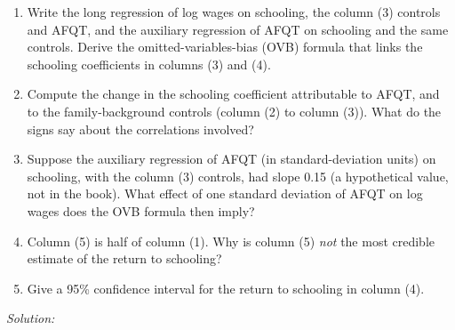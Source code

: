 \documentclass[11pt,a4paper]{article}
\newif\ifsolucoes
\newcommand{\espacoresol}{4.5cm}   %
\newcommand{\resolespaco}{\ifsolucoes\else\par\textit{Solution:}\vspace{\espacoresol}\par\fi}
\begin{document}
\begin{enumerate}[label=(\alph*)]
\item Write the long regression of log wages on schooling, the column (3) controls and AFQT, and the
auxiliary regression of AFQT on schooling and the same controls. Derive the omitted-variables-bias
(OVB) formula that links the schooling coefficients in columns (3) and (4).
\item Compute the change in the schooling coefficient attributable to AFQT, and to the family-background
controls (column (2) to column (3)). What do the signs say about the correlations involved?
\item Suppose the auxiliary regression of AFQT (in standard-deviation units) on schooling, with the column
(3) controls, had slope 0.15 (a hypothetical value, not in the book). What effect of one standard deviation
of AFQT on log wages does the OVB formula then imply?
\item Column (5) is half of column (1). Why is column (5) \emph{not} the most credible estimate of the
return to schooling?
\item Give a 95\% confidence interval for the return to schooling in column (4).
\end{enumerate}
\resolespaco
\end{document}
